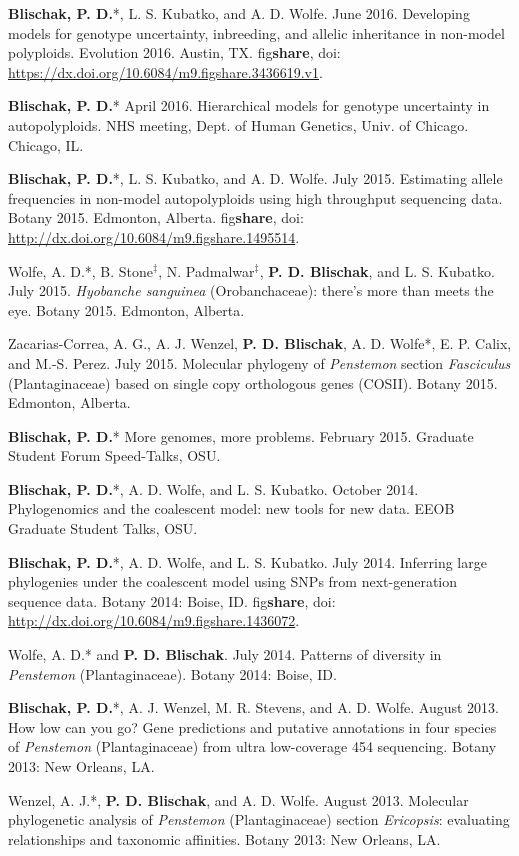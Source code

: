 \documentclass[]{article}
\begin{document}
\begin{etaremune}
\item
  \textbf{Blischak, P. D.}*, L. S. Kubatko, and A. D. Wolfe. June 2016.
  Developing models for genotype uncertainty, inbreeding, and
  allelic inheritance in non-model polyploids. Evolution 2016. Austin, TX.
  fig\textbf{share}, doi:
  \href{https://dx.doi.org/10.6084/m9.figshare.3436619.v1}{\url{https://dx.doi.org/10.6084/m9.figshare.3436619.v1}}.
\item
  \textbf{Blischak, P. D.}* April 2016. Hierarchical models for genotype
  uncertainty in autopolyploids. NHS meeting, Dept. of Human Genetics, Univ.
  of Chicago. Chicago, IL.
\item
  \textbf{Blischak, P. D.}*, L. S. Kubatko, and A. D. Wolfe. July 2015.
  Estimating allele frequencies in non-model autopolyploids using high
  throughput sequencing data. Botany 2015. Edmonton, Alberta.
  fig\textbf{share}, doi:
  \href{http://dx.doi.org/10.6084/m9.figshare.1495514}{\url{http://dx.doi.org/10.6084/m9.figshare.1495514}}.
\item
  Wolfe, A. D.*, B. Stone\(^{\ddagger}\), N. Padmalwar\(^{\ddagger}\),
  \textbf{P. D. Blischak}, and L. S. Kubatko. July 2015. \emph{Hyobanche
  sanguinea} (Orobanchaceae): there's more than meets the eye. Botany
  2015. Edmonton, Alberta.
\item
  Zacarias-Correa, A. G., A. J. Wenzel, \textbf{P. D. Blischak}, A. D.
  Wolfe*, E. P. Calix, and M.-S. Perez. July 2015. Molecular phylogeny of
  \emph{Penstemon} section \emph{Fasciculus} (Plantaginaceae) based on
  single copy orthologous genes (COSII). Botany 2015. Edmonton, Alberta.
\item
  \textbf{Blischak, P. D.}* More genomes, more problems. February 2015.
  Graduate Student Forum Speed-Talks, OSU.
\item
  \textbf{Blischak, P. D.}*, A. D. Wolfe, and L. S. Kubatko. October
  2014. Phylogenomics and the coalescent model: new tools for new data.
  EEOB Graduate Student Talks, OSU.
\item
  \textbf{Blischak, P. D.}*, A. D. Wolfe, and L. S. Kubatko. July 2014.
  Inferring large phylogenies under the coalescent model using SNPs from
  next-generation sequence data. Botany 2014: Boise, ID.
  fig\textbf{share}, doi:
  \href{http://dx.doi.org/10.6084/m9.figshare.1436072}{\url{http://dx.doi.org/10.6084/m9.figshare.1436072}}.
\item
  Wolfe, A. D.* and \textbf{P. D. Blischak}. July 2014. Patterns of
  diversity in \emph{Penstemon} (Plantaginaceae). Botany 2014: Boise,
  ID.
\item
  \textbf{Blischak, P. D.}*, A. J. Wenzel, M. R. Stevens, and A. D.
  Wolfe. August 2013. How low can you go? Gene predictions and putative
  annotations in four species of \emph{Penstemon} (Plantaginaceae) from
  ultra low-coverage 454 sequencing. Botany 2013: New Orleans, LA.
\item
  Wenzel, A. J.*, \textbf{P. D. Blischak}, and A. D. Wolfe. August 2013.
  Molecular phylogenetic analysis of \emph{Penstemon} (Plantaginaceae)
  section \emph{Ericopsis}: evaluating relationships and taxonomic
  affinities. Botany 2013: New Orleans, LA.
\end{etaremune}
\end{document}

